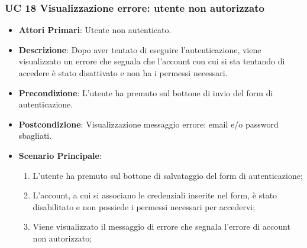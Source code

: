 
		\subsubsection{UC 18 Visualizzazione errore: utente non autorizzato}
		\begin{itemize}
			\item \textbf{Attori Primari}: Utente non autenticato.
			\item \textbf{Descrizione}: Dopo aver tentato di eseguire l'autenticazione, viene visualizzato un errore che segnala che l'account con cui si sta tentando di accedere è stato disattivato e non ha i permessi necessari.
			\item \textbf{Precondizione}: L'utente ha premuto sul bottone di invio del form di autenticazione.
			\item \textbf{Postcondizione}: Visualizzazione messaggio errore: email e/o password sbagliati.
			\item \textbf{Scenario Principale}:
			\begin{enumerate}
				\item L'utente ha premuto sul bottone di salvataggio del form di autenticazione;
				\item L'account, a cui si associano le credenziali inserite nel form, è stato disabilitato e non possiede i permessi necessari per accedervi;
				\item Viene visualizzato il messaggio di errore che segnala l'errore di account non autorizzato;
			\end{enumerate}
		\end{itemize}


